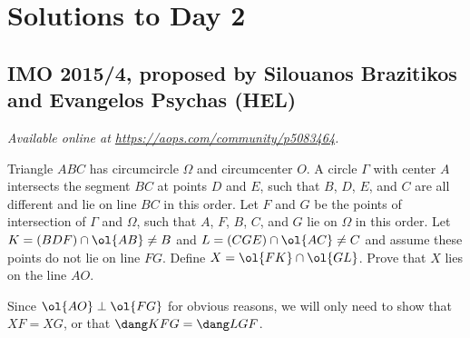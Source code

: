 \documentclass[11pt]{scrartcl}
\begin{document}
\section{Solutions to Day 2}
\subsection{IMO 2015/4, proposed by Silouanos Brazitikos and Evangelos Psychas (HEL)}
\textsl{Available online at \url{https://aops.com/community/p5083464}.}
\begin{mdframed}[style=mdpurplebox,frametitle={Problem statement}]
Triangle $ABC$ has circumcircle $\Omega$ and circumcenter $O$.
A circle $\Gamma$ with center $A$
intersects the segment $BC$ at points $D$ and $E$,
such that $B$, $D$, $E$, and $C$ are all different
and lie on line $BC$ in this order.
Let $F$ and $G$ be the points of intersection of $\Gamma$ and $\Omega$,
such that $A$, $F$, $B$, $C$, and $G$ lie on $\Omega$ in this order.
Let $K = (BDF) \cap \ol{AB} \neq B$
and $L = (CGE) \cap \ol{AC} \neq C$
and assume these points do not lie on line $FG$.
Define $X = \ol{FK} \cap \ol{GL}$.
Prove that $X$ lies on the line $AO$.
\end{mdframed}
Since $\ol{AO} \perp \ol{FG}$ for obvious reasons,
we will only need to show that $XF = XG$,
or that $\dang KFG = \dang LGF$.
\end{document}
